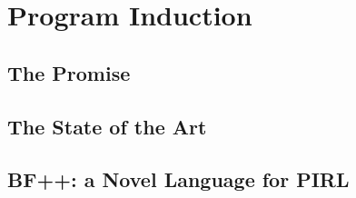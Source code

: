 \usepackage{lipsum}




\coverpage{\TITLE}{\SUBTITLE}{\AUTHOR}{\DATE}{\SUBJECT}

\newpage



\tableofcontents

\listoffigures

\listoftables


\printnomenclature

\part{Program Induction}
\newpage
\chapter{The Promise} \label{ch:autocode-motiv}

\newpage
\chapter{The State of the Art}\label{ch:autocode-sota}


\newpage
\chapter{BF++: a Novel Language for PIRL}\label{ch:bfpp}


